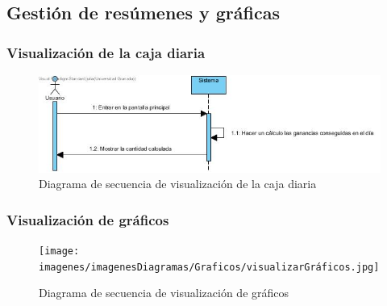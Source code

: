 \subsection{Gestión de resúmenes y gráficas}

\subsubsection{Visualización de la caja diaria}

\begin{figure}[H]
	\centering
	\includegraphics[width=1\textwidth]{imagenes/imagenesDiagramas/Graficos/visualizarCajaDiaria.jpg}
	\caption{Diagrama de secuencia de visualización de la caja diaria}
	\label{fig:seqdiag28}
\end{figure}

\subsubsection{Visualización de gráficos}

\begin{figure}[H]
	\centering
	\texttt{[image: imagenes/imagenesDiagramas/Graficos/visualizarGráficos.jpg]}
	\caption{Diagrama de secuencia de visualización de gráficos}
	\label{fig:seqdiag29}
\end{figure}

